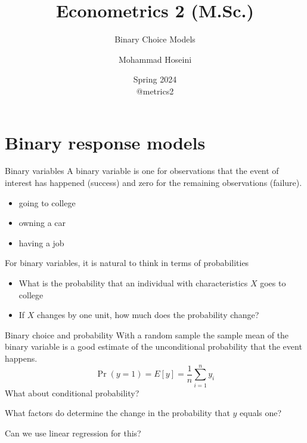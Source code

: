\documentclass{beamer}
\begin{document}
	\title[Econometrics 2]{Econometrics 2 (M.Sc.)}
	\subtitle{Binary Choice Models}
	\author[Mohammad Hoseini]{Mohammad Hoseini}
	
	
	\date[Spring 2024]{Spring 2024 \\
	\vspace{10pt} @metrics2
}
\begin{frame}[plain]
	\titlepage
\end{frame}

\section{Binary response models}

\begin{frame}{Binary variables}
A binary variable is one for observations that the event of interest has happened (success) and zero for the remaining observations (failure).
\begin{itemize}
	\item going to college
	\item owning a car
	\item having a job
\end{itemize}
\bigskip\pause

For binary variables, it is natural to think in terms of probabilities
\begin{itemize}
	\item What is the probability that an individual with characteristics $X$ goes to college
	\item If $X$ changes by one unit, how much does the probability change?
	
\end{itemize}
\end{frame}

\begin{frame}{Binary choice and probability}
With a random sample the sample mean of the binary variable is a good estimate of the unconditional probability that the event happens.
\[\Pr(y=1)=E[y]=\frac{1}{n}\sum_{i=1}^n y_i \]
What about conditional probability?\medskip

What factors do determine the change in the probability that $y$ equals one?\medskip\pause

Can we use linear regression for this?
\end{frame}
\end{document}
